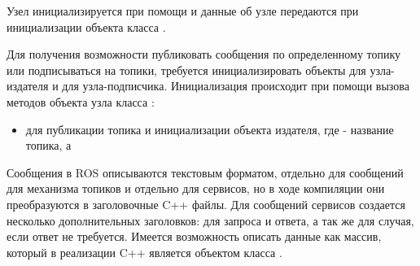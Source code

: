 Узел инициализируется при помощи  и данные об узле передаются при инициализации объекта класса .

Для получения возможности публиковать сообщения по определенному топику или подписываться на топики, требуется инициализировать объекты  для узла-издателя и  для узла-подписчика. Инициализация происходит при помощи вызова методов объекта узла класса :
\begin{itemize}[noitemsep]
	\item {} для публикации топика и инициализации объекта издателя, где  - название топика, а 
\end{itemize}

Сообщения в ROS описываются текстовым форматом, отдельно для сообщений для механизма топиков и отдельно для сервисов, но в ходе компиляции  они преобразуются в заголовочные C++ файлы. Для сообщений сервисов создается несколько дополнительных заголовков: для запроса и ответа, а так же для случая, если ответ не требуется. Имеется возможность описать данные как массив, который в реализации C++ является объектом класса .
